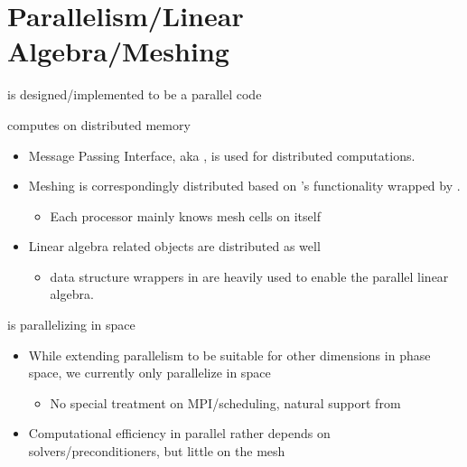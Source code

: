 \section{Parallelism/Linear Algebra/Meshing}
\begin{frame}{ is designed/implemented to be a parallel code}
	\begin{block}{ computes on distributed memory}
		\begin{itemize}
			\item Message Passing Interface, aka , is used for distributed computations.
			\item Meshing is correspondingly distributed based on 's functionality wrapped by .
			\begin{itemize}
				\item Each processor mainly knows mesh cells on itself
			\end{itemize}
			\item Linear algebra related objects are distributed as well
			\begin{itemize}
				\item {} data structure wrappers in  are heavily used to enable the parallel linear algebra.
			\end{itemize}
		\end{itemize}
	\end{block}
	\begin{block}{ is parallelizing in space}
		\begin{itemize}
			\item While extending parallelism to be suitable for other dimensions in phase space, we currently only parallelize in space
			\begin{itemize}
				\item No special treatment on MPI/scheduling, natural support from 
			\end{itemize}
			\item Computational efficiency in parallel rather depends on solvers/preconditioners, but little on the mesh
		\end{itemize}
	\end{block}
\end{frame}
